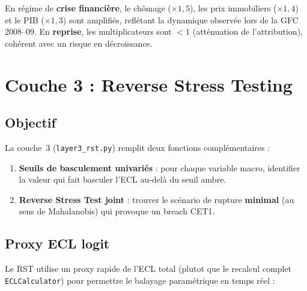 \documentclass[12pt,a4paper]{article}
\begin{document}
\begin{interpretbox}
En r\'egime de \textbf{crise financi\`ere}, le ch\^omage ($\times 1{,}5$),
les prix immobiliers ($\times 1{,}4$) et le PIB ($\times 1{,}3$) sont amplifi\'es,
refl\'etant la dynamique observ\'ee lors de la GFC 2008--09.
En \textbf{reprise}, les multiplicateurs sont $< 1$ (att\'enuation de l'attribution),
coh\'erent avec un risque en d\'ecroissance.
\end{interpretbox}


\newpage
\section{Couche 3 : Reverse Stress Testing}

\subsection{Objectif}

La couche~3 (\texttt{layer3\_rst.py}) remplit deux fonctions compl\'ementaires :

\begin{enumerate}
    \item \textbf{Seuils de basculement univari\'es} : pour chaque variable macro, identifier
          la valeur qui fait basculer l'ECL au-del\`a du seuil ambre.
    \item \textbf{Reverse Stress Test joint} : trouver le sc\'enario de rupture
          \textbf{minimal} (au sens de Mahalanobis) qui provoque un breach CET1.
\end{enumerate}

\subsection{Proxy ECL logit}

Le RST utilise un proxy rapide de l'ECL total (plutot que le recalcul complet
\texttt{ECLCalculator}) pour permettre le balayage param\'etrique en temps r\'eel :
\end{document}
